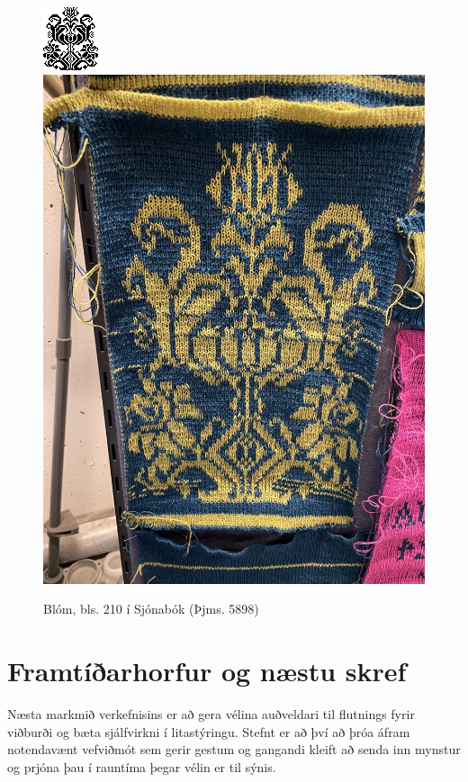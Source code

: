 \documentclass[a4paper,12pt]{article}
\begin{document}
\begin{figure}
    \centering
    \includegraphics[height=.20\textheight]{figs/thjms5898_210.png}
    \hspace{24pt}
    \includegraphics[height=.25\textheight]{figs/flower.jpg}
    \caption{Blóm, bls. 210 í Sjónabók (Þjms. 5898)}
    \label{fig:flower}
\end{figure}


\section{Framtíðarhorfur og næstu skref}
Næsta markmið verkefnisins er að gera vélina auðveldari til flutnings fyrir viðburði og bæta sjálfvirkni í litastýringu. 
Stefnt er að því að þróa áfram notendavænt vefviðmót sem gerir gestum og gangandi kleift að senda inn mynstur og prjóna þau í rauntíma þegar vélin er til sýnis.
\end{document}
